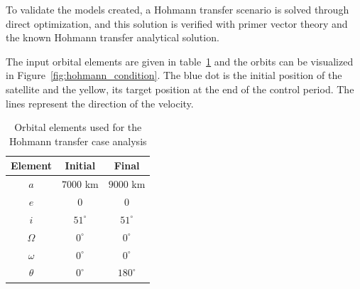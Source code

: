To validate the models created, a Hohmann transfer scenario is solved through direct optimization, and this solution is verified with primer vector theory and the known Hohmann transfer analytical solution.

The input orbital elements are given in table~\ref{tab:hohmann_orb_elems} and the orbits can be visualized in Figure~\ref{fig:hohmann_condition}. The blue dot is the initial position of the satellite and the yellow, its target position at the end of the control period. The lines represent the direction of the velocity.

\begin{table}[htbp]
    \centering
    \begin{tabular}{ccc} \toprule
        Element & Initial & Final \\ \midrule
        \(a\)      & \(7000\) km   & \(9000\) km   \\
        \(e\)      & \(0\)        & \(0\)        \\
        \(i\)      & \(51^\circ\) & \(51^\circ\) \\
        \(\Omega\) & \(0^\circ\)  & \(0^\circ\)  \\
        \(\omega\) & \(0^\circ\)  & \(0^\circ\)  \\
        \(\theta\) & \(0^\circ\)  & \(180^\circ\)  \\ \bottomrule
    \end{tabular}
    \caption{Orbital elements used for the Hohmann transfer case analysis}
    \label{tab:hohmann_orb_elems}
\end{table}

